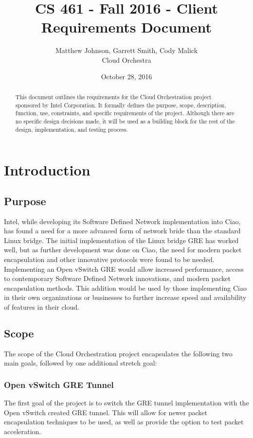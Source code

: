 \documentclass[10pt,letterpaper,onecolumn,draftclsnofoot]{IEEEtran}
\begin{document}
\begin{titlepage}
  \title{CS 461 - Fall 2016 - Client Requirements Document}
  \author{Matthew Johnson, Garrett Smith, Cody Malick\\Cloud Orchestra}
  \date{October 28, 2016}
  \maketitle
  \vspace{4cm}
  \begin{abstract}
  	\noindent This document outlines the requirements for the Cloud Orchestration
  	project sponsored by Intel Corporation. It formally defines the purpose, scope,
  	description, function, use, constraints, and specific requirements of the project.
  	Although there are no specific design decisions made, it will be used as a building
  	block for the rest of the design, implementation, and testing process.

  \end{abstract}

\end{titlepage}
\tableofcontents
\clearpage
\section{Introduction}
\subsection{Purpose}
Intel, while developing its Software Defined Network implementation into Ciao, has found
a need for a more advanced form of network bride than the standard Linux bridge. The initial
implementation of the Linux bridge GRE has worked well, but as further development was done on
Ciao, the need for modern packet encapsulation and other innovative protocols were found to
be needed. Implementing an Open vSwitch GRE would allow increased performance, access
to contemporary Software Defined Network innovations, and modern packet encapsulation methods.
This addition would be used by those implementing Ciao in their own organizations or businesses
to further increase speed and availability of features in their cloud. 
\subsection{Scope}
The scope of the Cloud Orchestration project encapsulates the following two main goals, followed
by one additional stretch goal:
\subsubsection{Open vSwitch GRE Tunnel}
The first goal of the project is to switch the GRE tunnel implementation with the Open vSwitch
created GRE tunnel. This will allow for newer packet encapsulation techniques to be used, as
well as provide the option to test packet acceleration.
\end{document}
